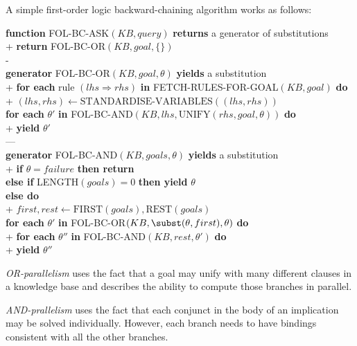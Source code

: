 \documentclass{article}
\begin{document}
\begin{definition}
    \newcommand{\func}{\textbf{function }}
    \newcommand{\return}{\textbf{return }}
    \newcommand{\returns}{\textbf{returns }}
    \newcommand{\generator}{\textbf{generator }}
    \newcommand{\foreach}[2]{\textbf{for each} #1 \textbf{in} #2 \textbf{do}}
    A simple first-order logic backward-chaining algorithm works as follows:
    \begin{pseudo}
        \func FOL-BC-ASK$(KB,query)$ \returns a generator of substitutions\\+
            \return FOL-BC-OR$(KB,goal,\{\})$\\-
        \\
        \generator FOL-BC-OR$(KB, goal, \theta)$ \textbf{yields} a substitution\\+
            \foreach{rule $(lhs\Rightarrow rhs)$}{FETCH-RULES-FOR-GOAL$(KB, goal)$}\\+
                $(lhs,rhs)\leftarrow\text{STANDARDISE-VARIABLES}((lhs, rhs))$\\
                \foreach{$\theta'$}{FOL-BC-AND$(KB,lhs,\text{UNIFY}(rhs,goal,\theta))$}\\+
                    \textbf{yield} $\theta'$\\---
        \\
        \generator FOL-BC-AND$(KB,goals,\theta)$ \textbf{yields} a substitution\\+
            \textbf{if} $\theta=failure$ \textbf{then return}\\
            \textbf{else if} LENGTH$(goals)=0$ \textbf{then yield} $\theta$\\
            \textbf{else do}\\+
                $first,rest\leftarrow \text{FIRST}(goals),\text{REST}(goals)$\\
                \foreach{$\theta'$}{FOL-BC-OR$(KB,\subst(\theta,first),\theta)$}\\+
                    \foreach{$\theta''$}{FOL-BC-AND$(KB,rest,\theta')$}\\+
                        \textbf{yield} $\theta''$

    \end{pseudo}
\end{definition}

\begin{definition}
    \emph{OR-parallelism} uses the fact that a goal may unify with many different
    clauses in a knowledge base and describes the ability to compute those branches
    in parallel.
\end{definition}

\begin{definition}
    \emph{AND-prallelism} uses the fact that each conjunct in the body of an implication
    may be solved individually. However, each branch needs to have bindings consistent
    with all the other branches.
\end{definition}
\end{document}
